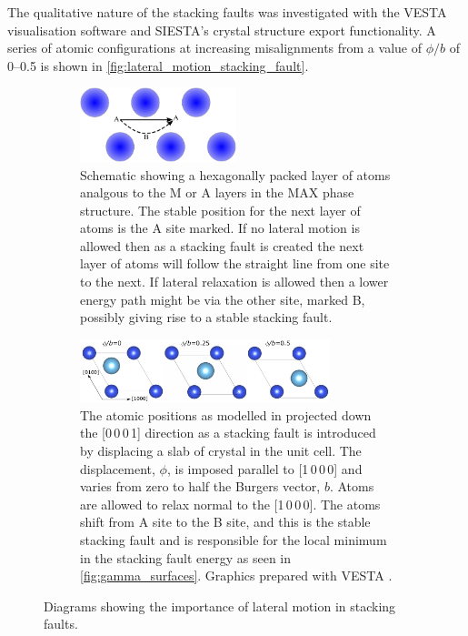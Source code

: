 The qualitative nature of the stacking faults was investigated with the VESTA visualisation software and SIESTA's crystal structure export functionality. A series of atomic configurations at increasing misalignments from a value of $\phi/b$ of \numrange{0}{0.5} is shown in \autoref{fig:lateral_motion_stacking_fault}.


\begin{figure}[!ht]
\centering


\begin{subfigure}{\textwidth}
\centering
\includegraphics[width=0.5\textwidth]{hex}
\captionsetup{width=0.9\textwidth}
\caption{Schematic showing a hexagonally packed layer of atoms analgous to the M or A layers in the MAX phase structure. The stable position for the next layer of atoms is the A site marked. If no lateral motion is allowed then as a stacking fault is created the next layer of atoms will follow the straight line from one site to the next. If lateral relaxation is allowed then a lower energy path might be via the other site, marked B, possibly giving rise to a stable stacking fault.}
\end{subfigure}

\vspace{1cm}

\begin{subfigure}{\textwidth}
\centering
\includegraphics[width=0.8\textwidth]{gamma}
\captionsetup{width=0.9\textwidth}
\caption[Atomic configurations around stacking faults.]{The atomic positions as modelled in  projected down the [0\,0\,0\,1] direction as a stacking fault is introduced by displacing a slab of crystal in the unit cell. The displacement, $\phi$, is imposed  parallel to [1\,0\,0\,0] and varies from zero to half the Burgers vector, $b$. Atoms are allowed to relax normal to the [1\,0\,0\,0]. The atoms shift from A site to the B site, and this is the stable stacking fault and is responsible for the local minimum in the stacking fault energy as seen in \autoref{fig:gamma_surfaces}. Graphics prepared with VESTA \cite{Momma2011}.}
\end{subfigure}

\caption{Diagrams showing the importance of lateral motion in stacking faults. \label{fig:lateral_motion_stacking_fault}}
\end{figure}




